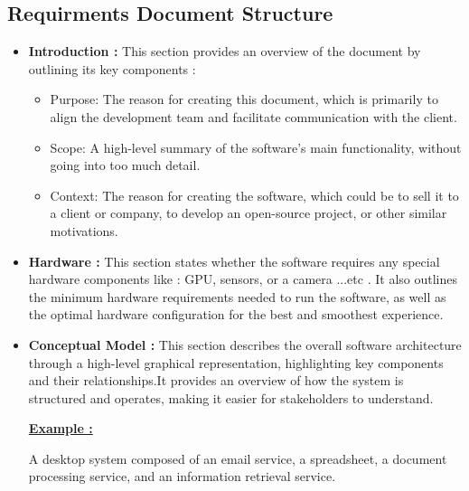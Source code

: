\subsection{Requirments Document Structure}
\begin{itemize}
   \item \textbf{Introduction : }This section provides an overview of the document by outlining its key components :
      \begin{itemize} 
          \item Purpose: The reason for creating this document, which is primarily to align the development team and facilitate
           communication with the client.
           \vspace{0.15cm}
          \item Scope: A high-level summary of the software’s main functionality, without going into too much detail. 
           \vspace{0.15cm}
          \item Context: The reason for creating the software, which could be to sell it to a client or company, to develop an
          open-source project, or other similar motivations.\\
      \end{itemize}    
    \item \textbf{Hardware : }This section states whether the software requires any special hardware components like : GPU,
sensors, or a camera ...etc . It also outlines the minimum hardware requirements needed to run the software, as well as the optimal hardware configuration for the best and smoothest experience.
    \item \textbf{Conceptual Model : }This section describes the overall software architecture through a high-level graphical
        representation, highlighting key components and their relationships.\hspace{0.1cm}It provides an overview of how the system is structured and
operates, making it easier for stakeholders to understand.

\textbf{\underline{Example :}}

A desktop system composed of an email service, a spreadsheet, a document processing service, and an information retrieval service.
\end{itemize}

